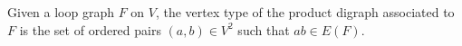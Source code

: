 \begin{definition}
Given a loop graph \(F\) on \(V\), the vertex type of the product digraph associated to \(F\) is the set of ordered pairs \((a,b)\in V^2\) such that \(ab\in E(F)\).
\end{definition}
